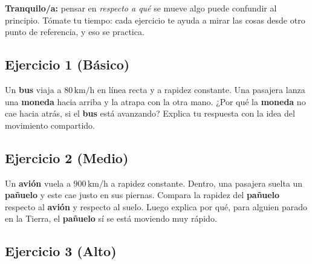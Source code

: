 \documentclass[
  spanish,
  letterpaper,
  12pt,
  oneside,
  open=any,
  DIV=15]{scrbook}
\begin{document}
\begin{tcolorbox}[enhanced jigsaw, arc=.35mm, bottomrule=.15mm, bottomtitle=1mm, breakable, colback=white, colbacktitle=quarto-callout-note-color!10!white, colframe=quarto-callout-note-color-frame, coltitle=black, left=2mm, leftrule=.75mm, opacityback=0, opacitybacktitle=0.6, rightrule=.15mm, title=\textcolor{quarto-callout-note-color}{\faInfo}\hspace{0.5em}{Apoyo Socioemocional}, titlerule=0mm, toprule=.15mm, toptitle=1mm]

\textbf{Tranquilo/a:} pensar en \emph{respecto a qué} se mueve algo
puede confundir al principio. Tómate tu tiempo: cada ejercicio te ayuda
a mirar las cosas desde otro punto de referencia, y eso se practica.

\end{tcolorbox}

\subsection{Ejercicio 1 (Básico)}\label{ejercicio-1-buxe1sico-6}

Un \textcolor[HTML]{7C3AED}{\textbf{bus}} viaja a \(80\,\text{km/h}\) en
línea recta y a rapidez constante. Una pasajera lanza una
\textcolor[HTML]{2563EB}{\textbf{moneda}} hacia arriba y la atrapa con
la otra mano. ¿Por qué la \textcolor[HTML]{2563EB}{\textbf{moneda}} no
cae hacia atrás, si el \textcolor[HTML]{7C3AED}{\textbf{bus}} está
avanzando? Explica tu respuesta con la idea del movimiento compartido.

\subsection{Ejercicio 2 (Medio)}\label{ejercicio-2-medio-6}

Un \textcolor[HTML]{7C3AED}{\textbf{avión}} vuela a \(900\,\text{km/h}\)
a rapidez constante. Dentro, una pasajera suelta un
\textcolor[HTML]{2563EB}{\textbf{pañuelo}} y este cae justo en sus
piernas. Compara la rapidez del
\textcolor[HTML]{2563EB}{\textbf{pañuelo}} respecto al
\textcolor[HTML]{7C3AED}{\textbf{avión}} y respecto al suelo. Luego
explica por qué, para alguien parado en la Tierra, el
\textcolor[HTML]{2563EB}{\textbf{pañuelo}} sí se está moviendo muy
rápido.

\subsection{Ejercicio 3 (Alto)}\label{ejercicio-3-alto-5}
\end{document}
